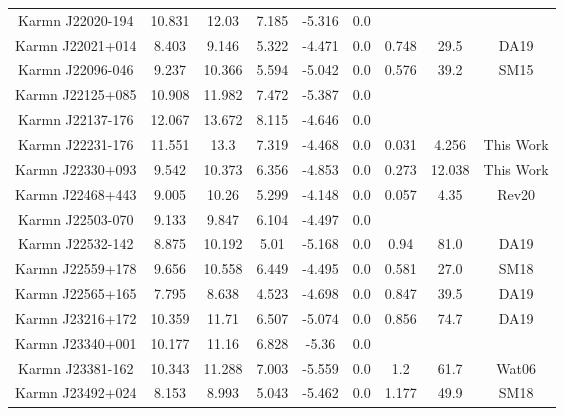 \begin{longtable}{ccccccccc}
    Karmn J22020-194 & 10.831 & 12.03 & 7.185 & -5.316 & 0.0 &  &  &  \\
    Karmn J22021+014 & 8.403 & 9.146 & 5.322 & -4.471 & 0.0 & 0.748 & 29.5 & DA19 \\
    Karmn J22096-046 & 9.237 & 10.366 & 5.594 & -5.042 & 0.0 & 0.576 & 39.2 & SM15 \\
    Karmn J22125+085 & 10.908 & 11.982 & 7.472 & -5.387 & 0.0 &  &  &  \\
    Karmn J22137-176 & 12.067 & 13.672 & 8.115 & -4.646 & 0.0 &  &  &  \\
    Karmn J22231-176 & 11.551 & 13.3 & 7.319 & -4.468 & 0.0 & 0.031 & 4.256 & This Work \\
    Karmn J22330+093 & 9.542 & 10.373 & 6.356 & -4.853 & 0.0 & 0.273 & 12.038 & This Work \\
    Karmn J22468+443 & 9.005 & 10.26 & 5.299 & -4.148 & 0.0 & 0.057 & 4.35 & Rev20 \\
    Karmn J22503-070 & 9.133 & 9.847 & 6.104 & -4.497 & 0.0 &  &  &  \\
    Karmn J22532-142 & 8.875 & 10.192 & 5.01 & -5.168 & 0.0 & 0.94 & 81.0 & DA19 \\
    Karmn J22559+178 & 9.656 & 10.558 & 6.449 & -4.495 & 0.0 & 0.581 & 27.0 & SM18 \\
    Karmn J22565+165 & 7.795 & 8.638 & 4.523 & -4.698 & 0.0 & 0.847 & 39.5 & DA19 \\
    Karmn J23216+172 & 10.359 & 11.71 & 6.507 & -5.074 & 0.0 & 0.856 & 74.7 & DA19 \\
    Karmn J23340+001 & 10.177 & 11.16 & 6.828 & -5.36 & 0.0 &  &  &  \\
    Karmn J23381-162 & 10.343 & 11.288 & 7.003 & -5.559 & 0.0 & 1.2 & 61.7 & Wat06 \\
    Karmn J23492+024 & 8.153 & 8.993 & 5.043 & -5.462 & 0.0 & 1.177 & 49.9 & SM18 \\

\end{longtable}
